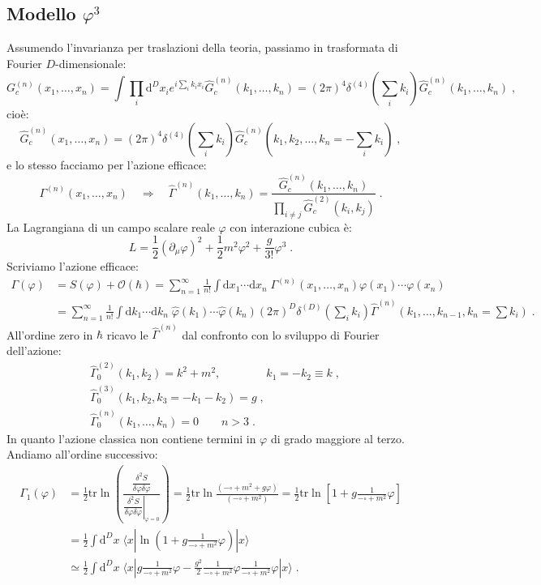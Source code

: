 \documentclass[12pt,a4paper]{article}
\theoremstyle{definition}
\numberwithin{equation}{section}
\newcommand{\diff}[1][]{\mathrm{d}#1}
\newcommand{\bra}{\langle}
\newcommand{\ket}{\rangle}
\newcommand{\tr}{\mathrm{tr}}
\begin{document}
\subsection{Modello $\varphi^3$}
Assumendo l'invarianza per traslazioni della teoria, passiamo in trasformata di Fourier $D$-dimensionale:
\begin{equation*}
G_c^{(n)}(x_1,\ldots,x_n)=\int\prod_i\diff^D{x_i}e^{i\sum_ik_ix_i}\hat{G}_c^{(n)}(k_1,\ldots,k_n)=(2\pi)^4\delta^{(4)}\left(\sum_ik_i\right)\hat{G}_c^{(n)}(k_1,\ldots,k_n)\;,
\end{equation*}
cioè:
\begin{equation}
\boxed{
\hat{G}_c^{(n)}(x_1,\ldots,x_n)=(2\pi)^4\delta^{(4)}\left(\sum_ik_i\right)\hat{G}_c^{(n)}(k_1,k_2,\ldots,k_n=-\sum_ik_i)
}\;,
\end{equation}
e lo stesso facciamo per l'azione efficace:
\begin{equation}
\boxed{
\Gamma^{(n)}(x_1,\ldots,x_n)\quad \Longrightarrow\quad \hat{\Gamma}^{(n)}(k_1,\ldots,k_n)=\frac{\hat{G}_c^{(n)}(k_1,\ldots,k_n)}{\prod_{i\ne j}\hat{G}_c^{(2)}(k_i,k_j)}
}\;.
\end{equation}
La Lagrangiana di un campo scalare reale $\varphi$ con interazione cubica è:
$$
L=\frac{1}{2}(\partial_{\mu}\varphi)^2+\frac{1}{2}m^2\varphi^2+\frac{g}{3!}\varphi^3\;.
$$
Scriviamo l'azione efficace:
\begin{align*}
\Gamma(\varphi)& = S(\varphi)+\mathcal{O}(\hbar) =\sum_{n=1}^{\infty}\frac{1}{n!}\int\diff{x_1}\cdots\diff{x_n}\;\Gamma^{(n)}(x_1,\ldots,x_n)\varphi(x_1)\cdots\varphi(x_n) \\
&=\sum_{n=1}^{\infty}\frac{1}{n!}\int\diff{k_1}\cdots\diff{k_n}\;\hat{\varphi}(k_1)\cdots\hat{\varphi}(k_n)(2\pi)^D\delta^{(D)}\left(\sum_ik_i\right)\hat{\Gamma}^{(n)}(k_1,\ldots,k_{n-1},k_n=\sum k_i)\;.
\end{align*}
All'ordine zero in $\hbar$ ricavo le $\hat{\Gamma}^{(n)}$ dal confronto con lo sviluppo di Fourier dell'azione:
\begin{align*}
&\hat{\Gamma}_0^{(2)}(k_1,k_2)=k^2+m^2,\qquad\qquad k_1=-k_2\equiv k\;, \\
&\hat{\Gamma}_0^{(3)}(k_1,k_2,k_3=-k_1-k_2)=g\;, \\
&\hat{\Gamma}_0^{(n)}(k_1,\ldots,k_n)=0\qquad n>3\;.
\end{align*}
In quanto l'azione classica non contiene termini in $\varphi$ di grado maggiore al terzo. \\
Andiamo all'ordine successivo:
\begin{align*}
\Gamma_1(\varphi)&=\frac{1}{2}\tr\ln\left(\frac{\dfrac{\delta^2 S}{\delta\varphi\delta\varphi}}{\left.\dfrac{\delta^2 S}{\delta\varphi\delta\varphi}\right|_{\varphi=0}} \right)=\frac{1}{2}\tr\ln\frac{(-\square+m^2+g\varphi)}{(-\square+m^2)}
=\frac{1}{2}\tr\ln\left[1+g\frac{1}{-\square+m^2}\varphi\right] \\
&=\frac{1}{2}\int\diff^D{x}\;\bra x|\ln\left(1+g\frac{1}{-\square+m^2}\varphi\right)|x\ket \\
&\simeq \frac{1}{2}\int\diff^D{x}\;\bra x\left|g\frac{1}{-\square+m^2}\varphi-\frac{g^2}{2}\frac{1}{-\square+m^2}\varphi\frac{1}{-\square+m^2}\varphi\right|x\ket\;.
\end{align*}
\end{document}
